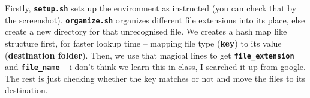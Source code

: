 \documentclass{article}
\theoremstyle{remark}
\begin{document}
\begin{enumerate}
    Firstly, \textbf{\texttt{setup.sh}} sets up the environment as instructed (you can check that by the screenshot). 
    \textbf{\texttt{organize.sh}} organizes different file extensions into its place, else create a new directory for that unrecognised file. 
    We creates a hash map like structure first, for faster lookup time -- mapping file type (\textbf{key}) to its value (\textbf{destination folder}). 
    Then, we use that magical lines to get \textbf{\texttt{file\_extension}} and \textbf{\texttt{file\_name}} -- i don't think we learn this in class, I searched it up from google. 
    The rest is just checking whether the key matches or not and move the files to its destination.

    \end{enumerate}
\end{document}
